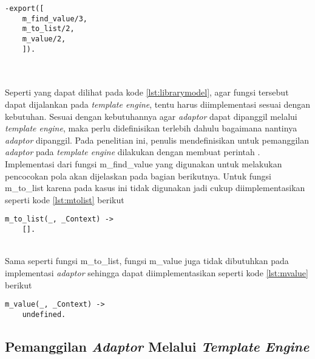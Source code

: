 \begin{minipage}{\linewidth}
	\begin{lstlisting}[caption={Fungsi yang harus diekspor untuk model},label={lst:librarymodel}]
	-export([
	m_find_value/3,
	m_to_list/2,
	m_value/2,
	]).
	\end{lstlisting}
\end{minipage}\\\\

Seperti yang dapat dilihat pada kode \ref{lst:librarymodel}, agar fungsi tersebut dapat dijalankan pada \textit{template engine}, tentu harus diimplementasi sesuai dengan kebutuhan. Sesuai dengan kebutuhannya agar \textit{adaptor} dapat dipanggil melalui \textit{template engine}, maka perlu didefinisikan terlebih dahulu bagaimana nantinya \textit{adaptor} dipanggil. Pada penelitian ini, penulis mendefinisikan untuk pemanggilan \textit{adaptor} pada \textit{template engine} dilakukan dengan membuat perintah . Implementasi dari fungsi m\_find\_value yang digunakan untuk melakukan pencocokan pola akan dijelaskan pada bagian berikutnya. Untuk fungsi m\_to\_list karena pada kasus ini tidak digunakan jadi cukup diimplementasikan seperti kode \ref{lst:mtolist} berikut

\begin{minipage}{\linewidth}
	\begin{lstlisting}[caption={Implementasi fungsi m\_to\_list},label={lst:mtolist}]
	m_to_list(_, _Context) ->
	[].
	\end{lstlisting}
\end{minipage}\\

Sama seperti fungsi m\_to\_list, fungsi m\_value juga tidak dibutuhkan pada implementasi \textit{adaptor} sehingga dapat diimplementasikan seperti kode \ref{lst:mvalue} berikut

\begin{minipage}{\linewidth}
	\begin{lstlisting}[caption={Implementasi fungsi m\_value},label={lst:mvalue}]
	m_value(_, _Context) ->
	undefined.
	\end{lstlisting}
\end{minipage}

\subsection{Pemanggilan \textit{Adaptor} Melalui \textit{Template Engine}}

